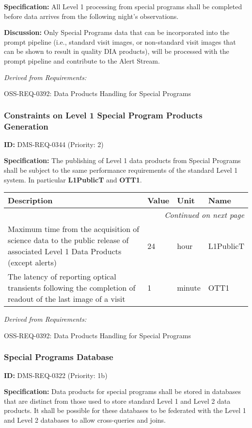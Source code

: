 \documentclass[SE,toc,lsstdraft]{lsstdoc}
\makeatletter
\newcommand{\paramname}[1]{\hspace{0pt}#1}
\newcommand{\unitname}[1]{\hspace{0pt}#1}
\newenvironment{parameters}[0]{%
\setlength\LTleft{0pt}
\setlength\LTright{\fill}
\begin{small}
\begin{longtable}[]{|p{0.49\textwidth}|l|p{0.6in}|p{1.70in}@{}|}

\hline \textbf{Description} & \textbf{Value} & \textbf{Unit} & \textbf{Name} \\ \hline
\endhead

\hline \multicolumn{4}{r}{\emph{Continued on next page}} \\
\endfoot

\hline\hline
\endlastfoot
}{%
\hline
\end{longtable}
\end{small}
}
\makeatother
\begin{document}
\textbf{Specification:} All Level 1 processing from special programs shall be completed before data arrives from the following night's observations.

\textbf{Discussion:}
Only Special Programs data that can be incorporated into the prompt pipeline (i.e., standard visit images, or non-standard visit images that can be shown to result in quality DIA products), will be processed with the prompt pipeline and contribute to the Alert Stream.

\emph{Derived from Requirements:}

OSS-REQ-0392:
Data Products Handling for Special Programs \newline

\subsubsection{Constraints on Level 1 Special Program Products Generation}

\label{DMS-REQ-0344}
\textbf{ID:} DMS-REQ-0344 (Priority: 2)

\textbf{Specification:}
    The publishing of Level 1 data products from Special Programs shall be subject to the same performance requirements of the standard Level 1 system. In particular \textbf{L1PublicT} and \textbf{OTT1}.

\begin{parameters}
Maximum time from the acquisition of science data to the public release of associated Level 1 Data Products (except alerts)
&
24
&
\unitname{%
hour
}
&
\paramname{%
L1PublicT
} \\\hline
The latency of reporting optical transients following the completion of readout of the last image of a visit
&
1
&
\unitname{%
minute
}
&
\paramname{%
OTT1
} \\\hline
\end{parameters}

\emph{Derived from Requirements:}

OSS-REQ-0392:
Data Products Handling for Special Programs \newline

\subsubsection{Special Programs Database}

\label{DMS-REQ-0322}
\textbf{ID:} DMS-REQ-0322 (Priority: 1b)

\textbf{Specification:} Data products for special programs shall be stored in databases that are distinct from those used to store standard Level 1 and Level 2 data products. It shall be possible for these databases to be federated with the Level 1 and Level 2 databases to allow cross-queries and joins.
\end{document}
